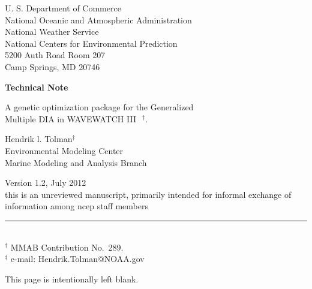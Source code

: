 \documentclass[12pt]{article}
\newcommand{\wwt}{WAVEWATCH III$\:$\textsuperscript\textregistered}
\newcommand{\bpage}{\vfill \pagebreak \strut

\vspace{2.5in} \centerline{This page is intentionally left blank.}}
\begin{document}

\pagestyle{empty}

\strut \vspace{5mm}

\begin{center} 
U. S. Department of Commerce \\
National Oceanic and Atmospheric Administration \\
National Weather Service \\
National Centers for Environmental Prediction \\
5200 Auth Road Room 207 \\
Camp Springs, MD 20746

\vspace{15mm}

{\bf Technical Note}

\vspace{15mm}

{\large A genetic optimization package for the Generalized \\ Multiple DIA in
  \wwt\ $^\dag$.}

\vspace{20mm}

Hendrik l. Tolman$^\ddag$
\\
Environmental Modeling Center \\
Marine Modeling and Analysis Branch

\vspace{20mm}

Version 1.2, July 2012 \\

\vfill {\sc this is an unreviewed manuscript, primarily
intended for informal exchange of information among ncep staff
members}

\end{center}
\noindent \rule{140mm}{0.5mm} \\
{\small $^\dag$ MMAB Contribution No.~289. \\
$^\ddag$ e-mail: Hendrik.Tolman@NOAA.gov} \\

\bpage

\pagebreak
\end{document}
